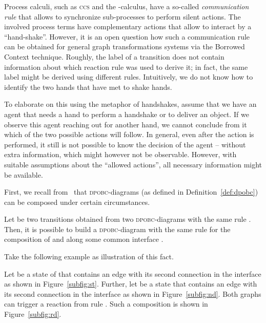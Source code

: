 







Process calculi, such as \textsc{ccs} and the -calculus, 
have a so-called \emph{communication rule} that allows to synchronize sub-processes to
perform silent actions.
The involved process terms have complementary actions that allow to
interact 
by a ``hand-shake''.
However, it is an open question how such a communication rule can be
obtained for general graph transformations systems
via the Borrowed Context technique.
Roughly, 
the label of a transition does not contain information about which
reaction rule was used to derive it;
in fact, 
the same label might be derived using different rules. 
Intuitively, 
we do not know how to identify the  two hands that have met to shake hands.


To elaborate on this using the  metaphor of handshakes, 
assume that we have an agent that needs a hand to perform a
handshake 
or to deliver an object. 
If we observe this agent reaching out for another hand, 
we cannot conclude from it which of the two possible actions will follow. 
In general, 
even after the action is performed,
it still is not possible to know the decision of the agent --
without extra information, which might however not be observable. 
However, 
with suitable assumptions about the ``allowed actions'',
all necessary information might be available. 







First, we recall from~\cite{BEK06} 
that  \textsc{dpobc}-diagrams (as defined in Definition~\ref{def:dpobc}) can be composed under certain circumstances. 
\begin{fact}
  Let  
  be two transitions obtained from two \textsc{dpobc}-diagrams
  with the same rule .
Then, it is possible to build a \textsc{dpobc}-diagram with the same rule for the composition of  and  along some common interface . 
\end{fact}

Take the following example as illustration of this fact. 

\begin{example} 
  Let  be a state of  
  that contains an edge  with its second connection in the interface
  as shown in Figure~\ref{subfig:st}.
  Further, let  be a state 
  that contains  an edge  with its second connection in the interface
  as shown in Figure~\ref{subfig:nd}.
  Both graphs can trigger a reaction from rule . 
  Such a composition is shown in Figure~\ref{subfig:rd}.
\end{example}

